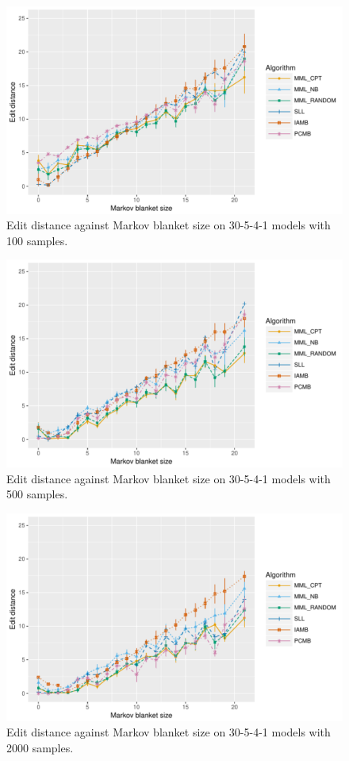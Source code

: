 \begin{figure}[H]
  \centering
    \includegraphics[scale=0.6]{figures/ed_vs_mbsize_30_5_4_1_100.pdf}
  \caption{Edit distance against Markov blanket size on 30-5-4-1 models with 100 samples.}
\end{figure} 

\begin{figure}[H]
  \centering
    \includegraphics[scale=0.6]{figures/ed_vs_mbsize_30_5_4_1_500.pdf}
  \caption{Edit distance against Markov blanket size on 30-5-4-1 models with 500 samples.}
\end{figure}

\begin{figure}[H]
  \centering
    \includegraphics[scale=0.6]{figures/ed_vs_mbsize_30_5_4_1_2000.pdf}
  \caption{Edit distance against Markov blanket size on 30-5-4-1 models with 2000 samples.}
\end{figure} 

